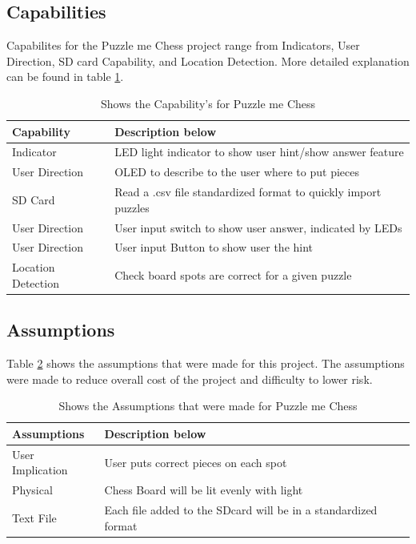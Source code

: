 \documentclass[11pt]{article}
\begin{document}
\subsection{Capabilities}
Capabilites for the Puzzle me Chess project range from Indicators, User Direction, SD card Capability, and Location Detection. More detailed explanation can be found in table \ref{tab:capability}.

\begin{table}
\begin{center}
    \begin{tabular}{| l | l |}
    \hline
    Capability  & Description below\\ \hline
    Indicator &  LED light indicator to show user hint/show answer feature \\ \hline
    User Direction & OLED to describe to the user where to put pieces \\ \hline 
    SD Card & Read a .csv file standardized format to quickly import puzzles \\ \hline
    User Direction & User input switch to show user answer, indicated by LEDs \\ \hline
    User Direction & User input Button to show user the hint \\ \hline
    Location Detection & Check board spots are correct for a given puzzle  \\ \hline
    \end{tabular}
    \caption{Shows the Capability's for Puzzle me Chess}
	\label{tab:capability}
\end{center}
\end{table}

\subsection{Assumptions}
Table \ref{tab:Assumptions} shows the assumptions that were made for this project. The assumptions were made to reduce overall cost of the project and difficulty to lower risk. 

\begin{table}
\begin{center}
    \begin{tabular}{| l | l |}
    \hline
    Assumptions & Description below\\ \hline
    User Implication  & User puts correct pieces on each spot \\ \hline
    Physical &  Chess Board will be lit evenly with light  \\ \hline
    Text File & Each file added to the SDcard will be in a standardized format \\ \hline     
    \end{tabular}
    \caption{Shows the Assumptions that were made for Puzzle me Chess}
	\label{tab:Assumptions}
\end{center}
\end{table}
\end{document}
